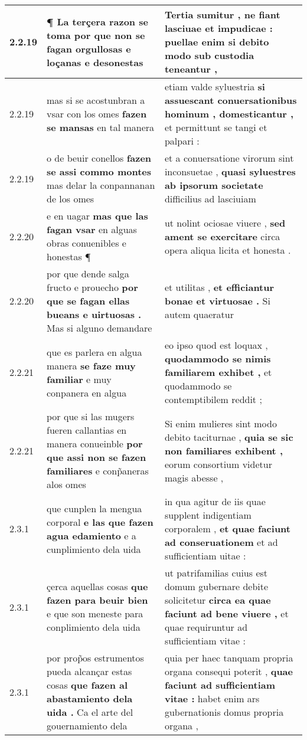 \begin{tabular}{|p{1cm}|p{6.5cm}|p{6.5cm}|}
2.2.19 & ¶ La terçera razon se toma \textbf{ por que non se fagan orgullosas } e loçanas e desonestas & Tertia sumitur , \textbf{ ne fiant lasciuae et impudicae : } puellae enim si debito modo sub custodia teneantur , \\\hline
2.2.19 & mas si se acostunbran a vsar con los omes \textbf{ fazen se mansas } en tal manera & etiam valde syluestria \textbf{ si assuescant conuersationibus hominum , domesticantur , } et permittunt se tangi et palpari : \\\hline
2.2.19 & o de beuir conellos \textbf{ fazen se assi commo montes } mas delar la conpannanan de los omes & et a conuersatione virorum sint inconsuetae , \textbf{ quasi syluestres ab ipsorum societate } difficilius ad lasciuiam \\\hline
2.2.20 & e en uagar \textbf{ mas que las fagan vsar } en alguas obras conuenibles e honestas ¶ & ut nolint ociosae viuere , \textbf{ sed ament se exercitare } circa opera aliqua licita et honesta . \\\hline
2.2.20 & por que dende salga fructo e prouecho \textbf{ por que se fagan ellas bueans e uirtuosas . } Mas si alguno demandare & et utilitas , \textbf{ et efficiantur bonae et virtuosae . } Si autem quaeratur \\\hline
2.2.21 & que es parlera en algua manera \textbf{ se faze muy familiar } e muy conpanera en algua & eo ipso quod est loquax , \textbf{ quodammodo se nimis familiarem exhibet , } et quodammodo se contemptibilem reddit ; \\\hline
2.2.21 & por que si las mugers fueren callantias en manera conueinble \textbf{ por que assi non se fazen familiares } e conp̃aneras alos omes & Si enim mulieres sint modo debito taciturnae , \textbf{ quia se sic non familiares exhibent , } eorum consortium videtur magis abesse , \\\hline
2.3.1 & que cunplen la mengua corporal \textbf{ e las que fazen agua edamiento } e a cunplimiento dela uida & in qua agitur de iis quae supplent indigentiam corporalem , \textbf{ et quae faciunt ad conseruationem } et ad sufficientiam uitae : \\\hline
2.3.1 & çerca aquellas cosas \textbf{ que fazen para beuir bien } e que son meneste para conplimiento dela uida & ut patrifamilias cuius est domum gubernare debite solicitetur \textbf{ circa ea quae faciunt ad bene viuere , } et quae requiruntur ad sufficientiam vitae : \\\hline
2.3.1 & por prop̃os estrumentos pueda alcançar estas cosas \textbf{ que fazen al abastamiento dela uida . } Ca el arte del gouernamiento dela & quia per haec tanquam propria organa consequi poterit , \textbf{ quae faciunt ad sufficientiam vitae : } habet enim ars gubernationis domus propria organa , \\\hline

\end{tabular}
